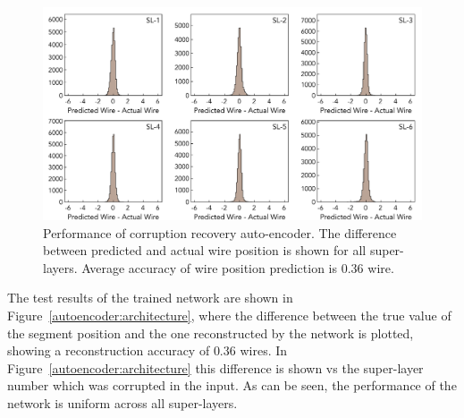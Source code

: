  \begin{figure}[!ht]
\begin{center}
\includegraphics[width=6.0in]{images/encoder_performance.pdf}
\caption {Performance of corruption recovery auto-encoder. The difference between predicted and actual wire position 
is shown for all super-layers. Average accuracy of wire position prediction is  $0.36$ wire.}
 \label{autoencoder:performance}
 \end{center}
\end{figure}
The test results of the trained network are shown in Figure~\ref{autoencoder:architecture}, where the difference between the true value 
of the segment position and the one reconstructed by the network is plotted, showing a reconstruction accuracy of $0.36$ wires.
In Figure~\ref{autoencoder:architecture} this difference is shown vs the super-layer number which was corrupted in the input.
As can be seen, the performance of the network is uniform across all super-layers.



